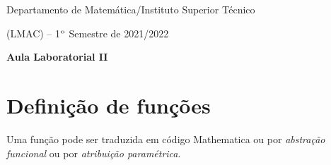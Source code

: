 \documentclass[11pt]{article}
\begin{document}

\noindent Departamento de  Matem\'atica/Instituto Superior
T\'ecnico \vspace{3mm}

 ({\small LMAC}) -- 1$^{\rm o}$ Semestre de 2021/2022\\

\vspace{-5mm}

\begin{center}
{\bf   Aula Laboratorial II  } \vspace{6mm}
\end{center}

\vspace{-1cm}


\section{Defini\c{c}\~ao de fun\c{c}\~oes }



Uma fun\c{c}\~ao pode ser traduzida em c\'odigo Mathematica ou por \textsl{abstra\c{c}\~ao funcional} ou por \textsl{atribui\c{c}\~ao param\'etrica}.
\end{document}
